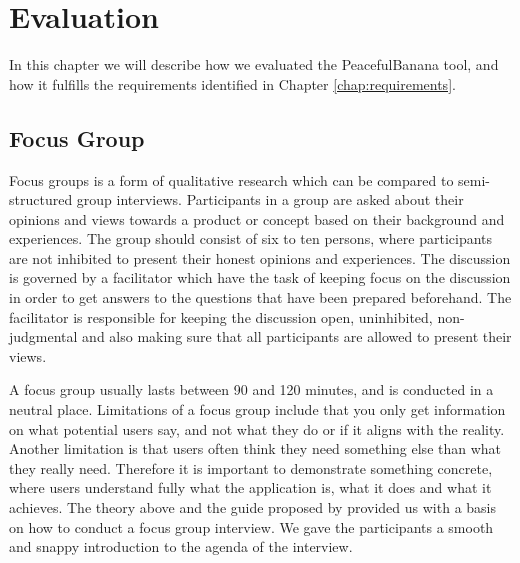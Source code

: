 \chapter{Evaluation}
\label{cha:evaluation}
In this chapter we will describe how we evaluated the PeacefulBanana tool, and how it fulfills the requirements identified in Chapter \ref{chap:requirements}.


 
\section{Focus Group}
Focus groups is a form of qualitative research which can be compared to semi-structured group interviews\citep{rogers2011interaction}. Participants in a group are asked about their opinions and views towards a product or concept based on their background and experiences\citep{krueger2008focus}. The group should consist of six to ten persons, where participants are not inhibited to present their honest opinions and experiences\citep{krueger2008focus}. The discussion is governed by a facilitator which have the task of keeping focus on the discussion in order to get answers to the questions that have been prepared beforehand\citep{krueger2008focus, nielsen1997use}. The facilitator is responsible for keeping the discussion open, uninhibited, non-judgmental and also making sure that all participants are allowed to present their views\citep{powell1996focus}. 

A focus group usually lasts between 90 and 120 minutes, and is conducted in a neutral place. Limitations of a focus group include that you only get information on what potential users say, and not what they do or if it aligns with the reality\citep{nielsen1997use}. Another limitation is that users often think they need something else than what they really need. Therefore it is important to demonstrate something concrete, where users understand fully what the application is, what it does and what it achieves. 
The theory above and the guide proposed by \citet{FocusGrpGuide} provided us with a basis on how to conduct a focus group interview. We gave the participants a smooth and snappy introduction to the agenda of the interview.

